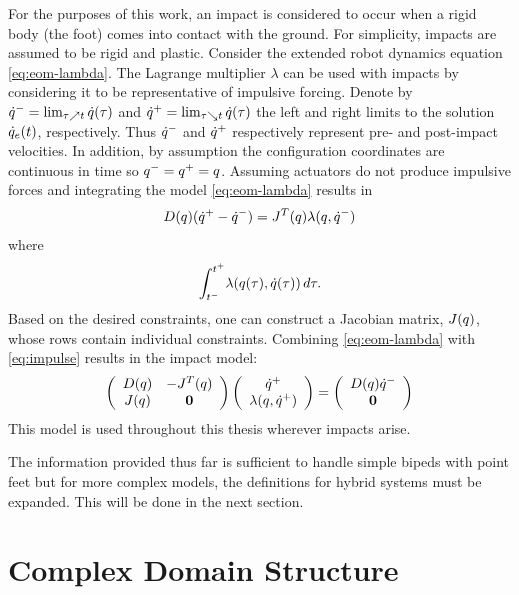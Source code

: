 For the purposes of this work, an impact is considered to occur when a rigid
body (the foot) comes into contact with the ground.
%
For simplicity, impacts are assumed to be rigid and plastic.
%
Consider the extended robot dynamics equation \eqref{eq:eom-lambda}.
%
The Lagrange multiplier $\lambda$ can be used with impacts by considering it to
be representative of impulsive forcing.
%
Denote by $\dot{q}^{-} = \lim_{\tau \nearrow t} \dot{q}(\tau)$ and $\dot{q}^{+} = \lim_{\tau
  \searrow t} \dot{q}(\tau)$ the left and right limits to the solution
$\dot{q}_{e}(t)$, respectively.
%
Thus $\dot{q}^{-}$ and $\dot{q}^{+}$ respectively represent pre- and post-impact velocities.
%
In addition, by assumption the configuration coordinates are continuous in time
so $q^{-} = q^{+} = q$.
%
Assuming actuators do not produce impulsive forces and integrating the model
\eqref{eq:eom-lambda} results in
\begin{align}
  \label{eq:impulse}
  D(q)(\dot{q}^{+} - \dot{q}^{-}) = J^{T}(q) \lambda(q, \dot{q}^{-})
\end{align}
where
\begin{align*}
  \int_{t^{-}}^{t^{+}} \! \lambda(q(\tau), \dot{q}(\tau)) \, d\tau.
\end{align*}
%
Based on the desired constraints, one can construct a Jacobian matrix,
$J(q)$, whose rows contain individual constraints.
%
Combining \eqref{eq:eom-lambda} with \eqref{eq:impulse} results in the impact model:
\begin{align*}
  \left(\begin{array}{c c}
      D(q) & -J^{T}(q)\\
      J(q) & {\mathbf 0}
    \end{array}\right)
  \left(\begin{array}{c}
      \dot{q}^{+}\\
      \lambda(q, \dot{q}^{+})
    \end{array}\right) =
  \left(\begin{array}{c}
      D(q) \dot{q}^{-}\\
      {\mathbf 0}
    \end{array}\right)
\end{align*}
%
This model is used throughout this thesis wherever impacts arise.

The information provided thus far is sufficient to handle simple bipeds with
point feet but for more complex models, the definitions for hybrid systems must
be expanded.
%
This will be done in the next section.



\section{Complex Domain Structure} \label{sec:complex-models}


